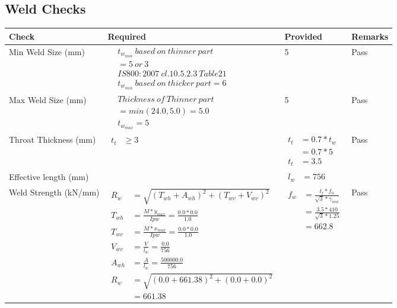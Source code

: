 \documentclass{article}%
\begin{document}
\subsection{Weld Checks}%
\label{subsec:WeldChecks}%
\renewcommand{\arraystretch}{1.2}%
\begin{longtable}{|p{3cm}|p{7cm}|p{5cm}|p{1cm}|}%
\hline%
\rowcolor{OsdagGreen}%
Check&Required&Provided&Remarks\\%
\hline%
\endhead%
\hline%
Min Weld Size (mm)&$\begin{aligned} & t_{w_{min}}~based~on~thinner~part\\ & =5~or~3\\ & IS800:2007~cl.10.5.2.3~Table 21\\ & t_{w_{min}}~based~on~thicker~part=6\end{aligned}$&5&Pass\\%
\hline%
Max Weld Size (mm)&$\begin{aligned} & Thickness~of~Thinner~part\\ &=min(24.0,5.0)=5.0\\ &t_{w_{max}} =5\end{aligned}$&5&Pass\\%
\hline%
Throat Thickness (mm)&$\begin{aligned} t_t &\geq 3 \end{aligned}$&$\begin{aligned} t_t & = 0.7* t_w \\ & = 0.7*5\\ t_t & = 3.5\end{aligned}$&Pass\\%
\hline%
Effective length (mm)&&$\begin{aligned} l_w &=756\end{aligned}$&\\%
\hline%
Weld Strength (kN/mm)&$\begin{aligned} R_w&=\sqrt{(T_{wh}+A_{wh})^2 + (T_{wv}+V_{wv})^2}\\ T_{wh}&=\frac{M*y_{max}}{I{pw}}=\frac{0.0*0.0}{1.0}\\ T_{wv}&=\frac{M*x_{max}}{I{pw}}=\frac{0.0*0.0}{1.0}\\ V_{wv}&=\frac{V}{l_w}=\frac{0.0}{756}\\ A_{wh}&=\frac{A}{l_w}=\frac{500000.0}{756}\\ R_w&=\sqrt{(0.0+661.38)^2 + (0.0+0.0)^2}\\ &=661.38\end{aligned}$&$\begin{aligned} f_w &=\frac{t_t*f_u}{\sqrt{3}*\gamma_{mw}}\\ &=\frac{3.5*410}{\sqrt{3}*1.25}\\ &=662.8\end{aligned}$&Pass\\%
\hline%
\end{longtable}
\end{document}
